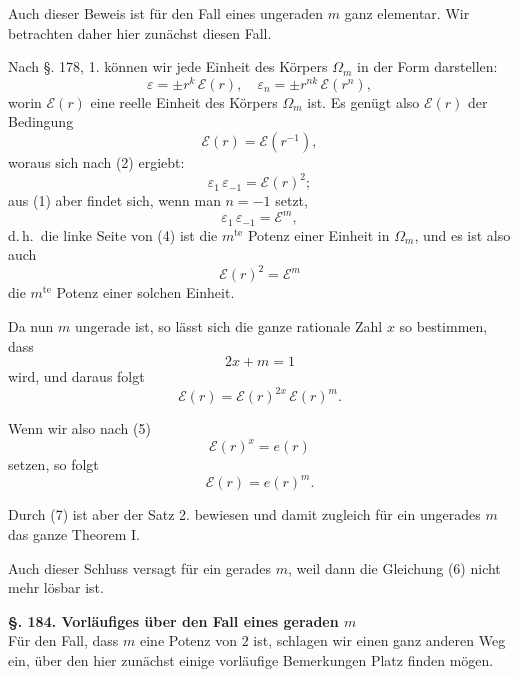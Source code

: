 \documentclass[12pt,a4paper]{article}
\begin{document}
Auch dieser Beweis ist für den Fall eines ungeraden $m$ ganz elementar. Wir betrachten daher hier zunächst diesen Fall.

Nach \S. 178, 1. können wir jede Einheit des Körpers $\Omega_m$ in der Form darstellen:
\begin{equation}\label{eq:183-2}
\varepsilon = \pm r^k\,\mathcal{E}(r),\quad \varepsilon_n = \pm r^{nk}\,\mathcal{E}(r^n),
\end{equation}
worin $\mathcal{E}(r)$ eine reelle Einheit des Körpers $\Omega_m$ ist. Es genügt also $\mathcal{E}(r)$ der Bedingung
\begin{equation}\label{eq:183-3}
\mathcal{E}(r) = \mathcal{E}(r^{-1}),
\end{equation}
woraus sich nach (2) ergiebt:
\begin{equation}\label{eq:183-4}
\varepsilon_1\,\varepsilon_{-1} = \mathcal{E}(r)^2;
\end{equation}
aus (1) aber findet sich, wenn man $n = -1$ setzt,
\[
\varepsilon_1\,\varepsilon_{-1} = \mathcal{E}^m,
\]
d.\,h.\ die linke Seite von (4) ist die $m^{\text{te}}$ Potenz einer Einheit in $\Omega_m$, und es ist also auch
\begin{equation}\label{eq:183-5}
\mathcal{E}(r)^2 = \mathcal{E}^m
\end{equation}
die $m^{\text{te}}$ Potenz einer solchen Einheit.

Da nun $m$ ungerade ist, so lässt sich die ganze rationale Zahl $x$ so bestimmen, dass
\begin{equation}\label{eq:183-6}
2x + m = 1
\end{equation}
wird, und daraus folgt
\[
\mathcal{E}(r) = \mathcal{E}(r)^{2x}\,\mathcal{E}(r)^m.
\]

Wenn wir also nach (5)
\[
\mathcal{E}(r)^x = e(r)
\]
setzen, so folgt
\begin{equation}\label{eq:183-7}
\mathcal{E}(r) = e(r)^m.
\end{equation}

Durch (7) ist aber der Satz 2. bewiesen und damit zugleich für ein ungerades $m$ das ganze Theorem I.

Auch dieser Schluss versagt für ein gerades $m$, weil dann die Gleichung (6) nicht mehr lösbar ist.

\bigskip\noindent\textbf{\S. 184. Vorläufiges über den Fall eines geraden $m$}\\[4pt]

Für den Fall, dass $m$ eine Potenz von $2$ ist, schlagen wir einen ganz anderen Weg ein, über den hier zunächst einige vorläufige Bemerkungen Platz finden mögen.
\end{document}
